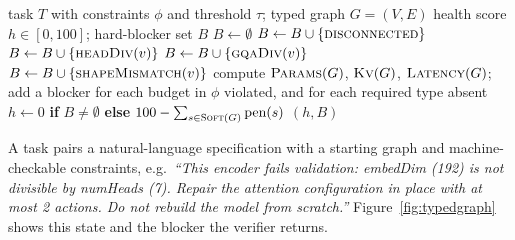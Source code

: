 \documentclass{article}
\begin{document}
\begin{algorithm}[t]
\caption{$\textsc{Grade}(T, G)$: the deterministic verifier}
\label{alg:grade}
\begin{algorithmic}[1]
\Require task $T$ with constraints $\phi$ and threshold $\tau$; typed graph $G=(V,E)$
\Ensure health score $h\in[0,100]$; hard-blocker set $B$
\State $B \gets \emptyset$
 $B \gets B \cup \{\textsc{disconnected}\}$ \EndIf
{}
   $B \gets B \cup \{\textsc{headDiv}(v)\}$ \EndIf
   $B \gets B \cup \{\textsc{gqaDiv}(v)\}$ \EndIf
\EndFor
{}
   $B \gets B \cup \{\textsc{shapeMismatch}(v)\}$ \EndIf
\EndFor
\State compute $\textsc{Params}(G)$, $\textsc{Kv}(G)$, $\textsc{Latency}(G)$; add a blocker for each budget in $\phi$ violated, and for each required type absent
\State $h \gets 0$ \textbf{if} $B \neq \emptyset$ \textbf{else} $100 - \sum_{s \in \textsc{Soft}(G)} \text{pen}(s)$
\State \Return $(h, B)$
\end{algorithmic}
\end{algorithm}

A task pairs a natural-language specification with a starting graph and machine-checkable constraints, e.g.\ \emph{``This encoder fails validation: embedDim (192) is not divisible by numHeads (7). Repair the attention configuration in place with at most 2 actions. Do not rebuild the model from scratch.''} Figure~\ref{fig:typedgraph} shows this state and the blocker the verifier returns.
\end{document}
